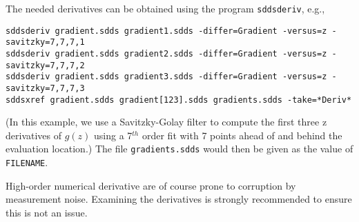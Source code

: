 The needed derivatives can be obtained using the program \verb|sddsderiv|, e.g.,
\begin{verbatim}
sddsderiv gradient.sdds gradient1.sdds -differ=Gradient -versus=z -savitzky=7,7,7,1
sddsderiv gradient.sdds gradient2.sdds -differ=Gradient -versus=z -savitzky=7,7,7,2
sddsderiv gradient.sdds gradient3.sdds -differ=Gradient -versus=z -savitzky=7,7,7,3
sddsxref gradient.sdds gradient[123].sdds gradients.sdds -take=*Deriv* 
\end{verbatim}
(In this example, we use a Savitzky-Golay filter to compute the first three z derivatives of $g(z)$
using a 7$^{th}$ order fit with 7 points ahead of and behind the evaluation location.)
The file \verb|gradients.sdds| would then be given as the value of \verb|FILENAME|.

High-order numerical derivative are of course prone to corruption by measurement noise. 
Examining the derivatives is strongly recommended to ensure this is not an issue.
